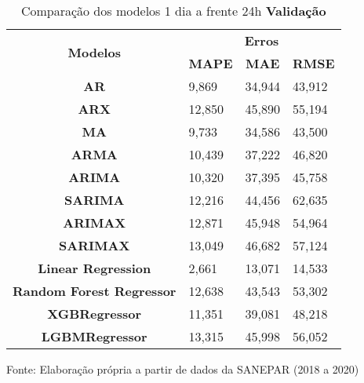 \begin{table}[H]
	\centering
	\caption{Comparação dos modelos 1 dia a frente 24h \textbf{Validação} }\label{tb:1-24vld}
	\begin{tabular}{@{}clll@{}}
		\toprule
		\multirow{2}{*}{\textbf{Modelos}} & \multicolumn{3}{c}{\textbf{Erros}}                                                                       \\ \cmidrule(l){2-4} 
		& \multicolumn{1}{c}{\textbf{MAPE}} & \multicolumn{1}{c}{\textbf{MAE}} & \multicolumn{1}{c}{\textbf{RMSE}} \\ \hline
\textbf{AR}                       & 9,869                             & 34,944                           & 43,912                            \\
\textbf{ARX}                      & 12,850                            & 45,890                           & 55,194                            \\
\textbf{MA}                       & 9,733                             & 34,586                           & 43,500                            \\
\textbf{ARMA}                     & 10,439                            & 37,222                           & 46,820                            \\
\textbf{ARIMA}                    & 10,320                            & 37,395                           & 45,758                            \\
\textbf{SARIMA}                   & 12,216                            & 44,456                           & 62,635                            \\
\textbf{ARIMAX}                   & 12,871                            & 45,948                           & 54,964                            \\
\textbf{SARIMAX}                  & 13,049                            & 46,682                           & 57,124                            \\
\textbf{Linear Regression}        & 2,661                             & 13,071                           & 14,533                            \\
\textbf{Random Forest Regressor}  & 12,638                            & 43,543                           & 53,302                            \\
\textbf{XGBRegressor}             & 11,351                            & 39,081                           & 48,218                            \\
\textbf{LGBMRegressor}            & 13,315                            & 45,998                           & 56,052                            \\ \bottomrule
	\end{tabular}

Fonte: Elaboração própria a partir de dados da SANEPAR (2018 a 2020)
\end{table}

